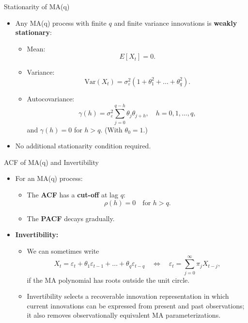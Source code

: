 \documentclass{beamer}
\begin{document}
\begin{frame}{Stationarity of MA(q)}
  \begin{itemize}
    \item Any MA(q) process with finite $q$ and finite variance innovations is \textbf{weakly stationary}:
      \begin{itemize}
        \item Mean:
          \[
            E[X_t] = 0.
          \]
        \item Variance:
          \[
            \mathrm{Var}(X_t) = \sigma_\varepsilon^2
            \left( 1 + \theta_1^2 + \dots + \theta_q^2 \right).
          \]
        \item Autocovariance:
          \[
            \gamma(h) = \sigma_\varepsilon^2 \sum_{j=0}^{q-h} \theta_j \theta_{j+h},
            \quad h = 0, 1, \dots, q,
          \]
          and $\gamma(h) = 0$ for $h > q$. (With $\theta_0 = 1$.)
      \end{itemize}
    \item No additional stationarity condition required.
  \end{itemize}
\end{frame}

\begin{frame}{ACF of MA(q) and Invertibility}
  \begin{itemize}
    \item For an MA(q) process:
      \begin{itemize}
        \item The \textbf{ACF} has a \textbf{cut-off} at lag $q$:
          \[
            \rho(h) = 0 \quad \text{for } h > q.
          \]
        \item The \textbf{PACF} decays gradually.
      \end{itemize}
    \item \textbf{Invertibility:}
      \begin{itemize}
        \item We can sometimes write
          \[
            X_t = \varepsilon_t + \theta_1 \varepsilon_{t-1} + \dots + \theta_q \varepsilon_{t-q}
            \quad \Longleftrightarrow \quad
            \varepsilon_t = \sum_{j=0}^{\infty} \pi_j X_{t-j},
          \]
          if the MA polynomial has roots outside the unit circle.
        \item Invertibility selects a recoverable innovation representation in which current innovations can be expressed from present and past observations; it also removes observationally equivalent MA parameterizations.
      \end{itemize}
  \end{itemize}
\end{frame}
\end{document}
